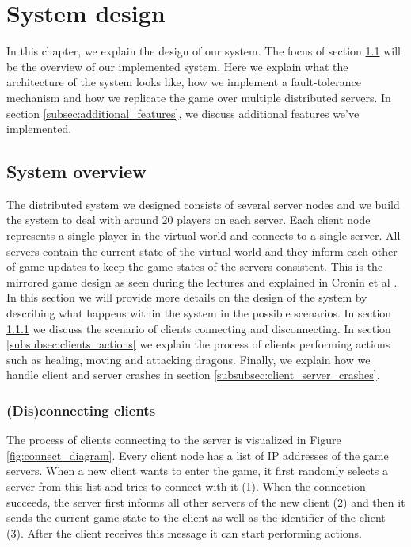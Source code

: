 \section{System design}
In this chapter, we explain the design of our system. The focus of section \ref{subsec:system_overview} will be the overview of our implemented system.
Here we explain what the architecture of the system looks like, how we implement a fault-tolerance mechanism and how we replicate the game over multiple distributed servers. 
In section \ref{subsec:additional_features}, we discuss additional features we've implemented.

\subsection{System overview}
\label{subsec:system_overview}
The distributed system we designed consists of several server nodes and we build the system to deal with around 20 players on each server. 
Each client node represents a single player in the virtual world and connects to a single server.
All servers contain the current state of the virtual world and they inform each other of game updates to keep the game states of the servers consistent. 
This is the mirrored game design as seen during the lectures and explained in Cronin et al \cite{cronin2002efficient}. 
In this section we will provide more details on the design of the system by describing what happens within the system in the possible scenarios. 
In section \ref{subsubsec:disconnecting_clients} we discuss the scenario of clients connecting and disconnecting. 
In section \ref{subsubsec:clients_actions} we explain the process of clients performing actions such as healing, moving and attacking dragons. 
Finally, we explain how we handle client and server crashes in section \ref{subsubsec:client_server_crashes}.

\subsubsection{(Dis)connecting clients}
\label{subsubsec:disconnecting_clients}
The process of clients connecting to the server is visualized in Figure \ref{fig:connect_diagram}. 
Every client node has a list of IP addresses of the game servers. When a new client wants to enter the game, it first randomly selects a server from this list and tries to connect with it (1). 
When the connection succeeds, the server first informs all other servers of the new client (2) and then it sends the current game state to the client as well as the identifier of the client (3). 
After the client receives this message it can start performing actions.

